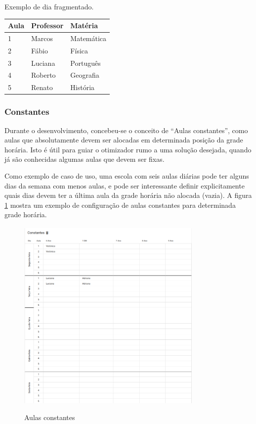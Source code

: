 \begin{quadro}[!htb]
	\centering
	\caption{Exemplo de dia fragmentado.\label{qua:fragmentado}}
	\begin{tabular}{|p{3cm}|p{3cm}|p{3cm}|}
		\hline
		\textbf{Aula} & \textbf{Professor} & \textbf{Matéria} \\
		\hline
		1 & Marcos & Matemática \\
		\hline
		2 & Fábio & Física \\
		\hline
		3 & Luciana & Português \\
		\hline
		4 & Roberto & Geografia \\
		\hline
		5 & Renato & História \\
		\hline
	\end{tabular}
\end{quadro}

\newpage
\subsubsection{Constantes}

Durante o desenvolvimento, concebeu-se o conceito de ``Aulas constantes'', como aulas que absolutamente devem ser alocadas em determinada posição da grade horária. Isto é útil para guiar o otimizador rumo a uma solução desejada, quando já são conhecidas algumas aulas que devem ser fixas. 

Como exemplo de caso de uso, uma escola com seis aulas diárias pode ter alguns dias da semana com menos aulas, e pode ser interessante definir explicitamente quais dias devem ter a última aula da grade horária não alocada (vazia). A figura \ref{fig:constantes} mostra um exemplo de configuração de aulas constantes para determinada grade horária.

\begin{figure}[h]
	\centering
	\caption{Aulas constantes}
	\includegraphics[width=0.8\textwidth]{./dados/figuras/constantes}
	\label{fig:constantes}
\end{figure}
\pagebreak

